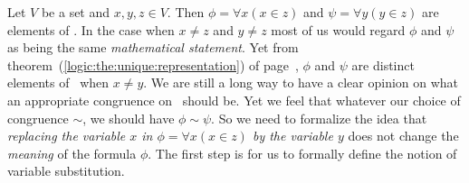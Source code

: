 Let $V$ be a set and $x,y,z\in V$. Then $\phi=\forall x(x\in z)$ and
$\psi=\forall y(y\in z)$ are elements of \pv. In the case when
$x\neq z$ and $y\neq z$ most of us would regard $\phi$ and $\psi$ as
being the same {\em mathematical statement}. Yet from
theorem~(\ref{logic:the:unique:representation}) of
page~\pageref{logic:the:unique:representation}, $\phi$ and $\psi$
are distinct elements of \pv\ when $x\neq y$. We are still a long
way to have a clear opinion on what an appropriate congruence on
\pv\ should be. Yet we feel that whatever our choice of congruence
$\sim$, we should have $\phi\sim\psi$. So we need to formalize the
idea that {\em replacing the variable $x$ in $\phi=\forall x(x\in
z)$ by the variable $y$} does not change the {\em meaning} of the
formula $\phi$. The first step is for us to formally define the
notion of variable substitution.

